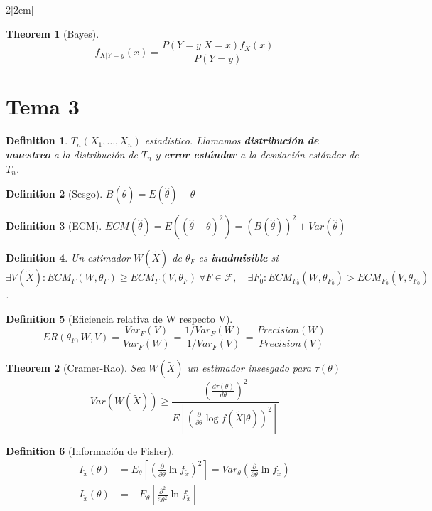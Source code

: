\documentclass[leqno]{article}
\newtheorem*{theorem}{Theorem}
\newtheorem*{definition}{Definition}
\begin{document}
\begin{multicols}{2}[\columnsep2em]
\begin{theorem}[Bayes]
  \[
  f_{X|Y=y}(x)= \frac{P(Y=y|X=x)f_X(x)}{P(Y=y)}
  \] 

\end{theorem}

\section{Tema 3}
\begin{definition} $T_n(X_1,\ldots, X_n)$ estadístico. Llamamos \textbf{distribución de muestreo} a la distribución de $T_n$ y  \textbf{error estándar} a la desviación estándar de $T_n$.
\end{definition}
\begin{definition}[Sesgo]
$B(\hat{\theta })=E(\hat{\theta })-\theta$
\end{definition}

\begin{definition}[ECM] $ECM(\hat{\theta })=E((\hat{\theta }-\theta )^2) = (B(\hat{\theta }))^2+ Var(\hat{\theta})$
\end{definition}

\begin{definition}
    Un estimador $W(\tilde X)$ de $\theta_F$ es \textbf{inadmisible} si $\exists V(\tilde X): ECM_F(W, \theta_F) \ge ECM_F(V, \theta_F) \ \forall F \in \mathcal{F}, \quad \exists F_0: ECM_{F_0}(W, \theta_{F_0}) > ECM_{F_0}(V, \theta_{F_0})$.
\end{definition}

\begin{definition} [Eficiencia relativa de W respecto V]
    \[
    ER(\theta_F, W, V) = \frac{Var_F(V)}{Var_F(W)} = \frac{1/Var_F(W)}{1/Var_F(V)} = \frac{Precision(W)}{Precision(V)}
    \]
\end{definition}

\begin{theorem}[Cramer-Rao] Sea $W(\tilde{X})$ un estimador insesgado para $\tau (\theta )$
  \[
	Var(W(\tilde{X}))\ge \frac{\left(\frac{d \tau (\theta )}{d \theta } \right)^2}{E\left[ \left( \frac{\partial}{\partial\theta } \log f(\tilde{X}|\theta ) \right)^2 \right]}
  \] 
\end{theorem}

\begin{definition}[Información de Fisher]
  \begin{align*}
  I_{\tilde{x}}(\theta ) & = E_\theta \left[ \left(  \frac{\partial}{\partial \theta } \ln f_{\tilde{x}} \right) ^2 \right]  = Var_\theta \left(\frac{\partial}{\partial \theta }\ln f_{\tilde{x}}\right) \\
  I_{\tilde{x}}(\theta ) & = -E_\theta \left[  \frac{\partial^2}{\partial \theta ^2} \ln f_{\tilde{x}} \right]
  \end{align*}
\end{definition}


\end{multicols}
\end{document}
